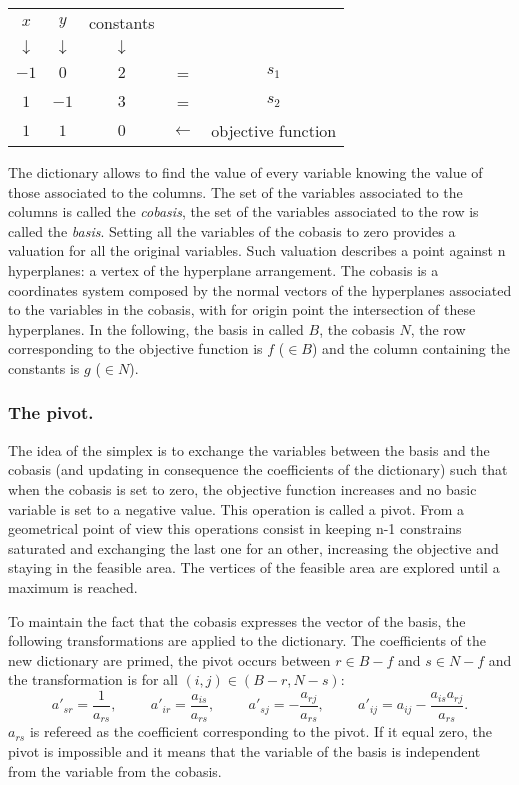 \begin{example}
	\begin{tabular}{| c | c || c || c c |}
	\hline	
	$x$ & $y$ & constants & & \\
	$\downarrow$ &$\downarrow$ &$\downarrow$ & & \\
	\hline
	\hline	
   	$-1$ & $0$ & $2$ & = & $s_1$\\ \hline	
   	$1$ & $-1$ & $3$ & = & $s_2$\\ \hline \hline	
   	$1$ & $1$ & $0$ & $\leftarrow$ & objective function \\
   	\hline	
 	\end{tabular}
	\label{lp3}
\end{example}

The dictionary allows to find the value of every variable knowing the value of those associated to the columns. The set of the variables associated to the columns is called the \emph{cobasis}, the set of the variables associated to the row is called the \emph{basis}. Setting all the variables of the cobasis to zero provides a valuation for all the original variables. Such valuation describes a point against n hyperplanes: a vertex of the hyperplane arrangement. The cobasis is a coordinates system composed by the normal vectors of the hyperplanes associated to the variables in the cobasis, with for origin point the intersection of these hyperplanes.
In the following, the basis in called $B$, the cobasis $N$, the row corresponding to the objective function is $f$ ($\in B$) and the column containing the constants is $g$ ($\in N$).  

\subsubsection{The pivot.} 
The idea of the simplex is to exchange the variables between the basis and the cobasis (and updating in consequence the coefficients of the dictionary) such that when the cobasis is set to zero, the objective function increases and no basic variable is set to a negative value. This operation is called a pivot. From a geometrical point of view this operations consist in keeping n-1 constrains saturated and exchanging the last one for an other, increasing the objective and staying in the feasible area. The vertices of the feasible area are explored until a maximum is reached.

To maintain the fact that the cobasis expresses the vector of the basis, the following transformations are applied to the dictionary. The coefficients of the new dictionary are primed, the pivot occurs between $r \in B-f$ and $s \in N-f$ and the transformation is for all $(i,j)\in (B-r,N-s)$:
$$ 
a'_{sr}=\frac{1}{a_{rs}}, \hspace{1cm} a'_{ir}=\frac{a_{is}}{a_{rs}}, \hspace{1cm} a'_{sj}=-\frac{a_{rj}}{a_{rs}}, \hspace{1cm} a'_{ij}=a_{ij}-\frac{a_{is}a_{rj}}{a_{rs}}.
$$
$a_{rs}$ is refereed as the coefficient corresponding to the pivot. If it equal zero, the pivot is impossible and it means that the variable of the basis is independent from the variable from the cobasis.


